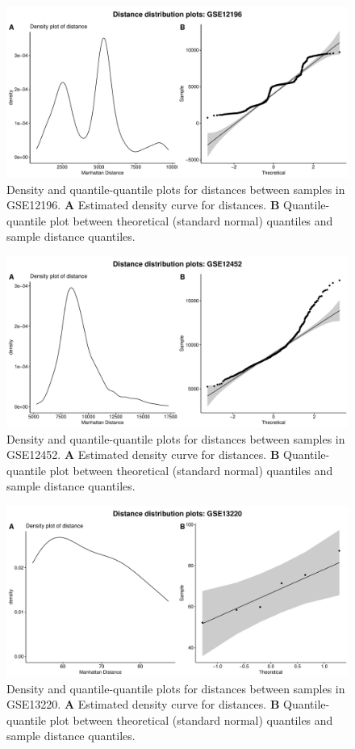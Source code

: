 \documentclass[10pt,letterpaper]{article}\usepackage[]{graphicx}\usepackage[]{color}
\begin{document}
\begin{figure}[H]
	\includegraphics[width=\textwidth]{manhattan-distance_hist_GSE12196.pdf}
	\caption{Density and quantile-quantile plots for distances between samples in GSE12196. \textbf{A} Estimated density curve for distances. \textbf{B} Quantile-quantile plot between theoretical (standard normal) quantiles and sample distance quantiles.}
\end{figure}

\begin{figure}[H]
	\includegraphics[width=\textwidth]{manhattan-distance_hist_GSE12452.pdf}
	\caption{Density and quantile-quantile plots for distances between samples in GSE12452. \textbf{A} Estimated density curve for distances. \textbf{B} Quantile-quantile plot between theoretical (standard normal) quantiles and sample distance quantiles.}
\end{figure}

\begin{figure}[H]
	\includegraphics[width=\textwidth]{manhattan-distance_hist_GSE13220.pdf}
	\caption{Density and quantile-quantile plots for distances between samples in GSE13220. \textbf{A} Estimated density curve for distances. \textbf{B} Quantile-quantile plot between theoretical (standard normal) quantiles and sample distance quantiles.}
\end{figure}
\end{document}
